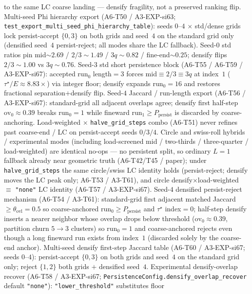 \documentclass[11pt]{article}
\begin{document}
to the same LC coarse landing --- densify fragility, not a preserved ranking
flip. Multi-seed Phi hierarchy export (A6-T50 / A3-EXP-si63;
\texttt{test\_export\_multi\_seed\_phi\_hierarchy\_table}): seeds $0$--$4$
$\times$ std/dense grids lock persist-accept $\{0,3\}$ on both grids and
seed~$4$ on the standard grid only (densified seed~$4$ persist-reject; all
modes share the LC fallback). Seed-$0$ std ratios pin mid$\sim 2.69$ /
$2/3\sim 1.49$ / $3q\sim 0.82$ / fine-end$\sim 0.25$; densify flips
$2/3\sim 1.00$ vs $3q\sim 0.76$. Seed-$3$ std short persistence block
(A6-T55 / A6-T59 / A3-EXP-si67): accepted $\mathrm{run}_0$ length${=}3$
forces mid$\equiv 2/3\equiv 3q$ at index~$1$ ($\tau^\star/E\approx 8.83\times$)
via integer floor; densify expands $\mathrm{run}_0{=}16$ and restores
fractional separation$+$densify flip. Seed-$4$ Jaccard / run-length
export (A6-T56 / A3-EXP-si67): standard-grid all adjacent overlaps
agree; densify first half-step $\mathrm{ov}_0\approx 0.39$ breaks
$\mathrm{run}_0{=}1$ while fineward $\mathrm{run}_1\ge P_{\mathrm{persist}}$
is discarded by coarse-anchoring. Load-weighted
$\times$ \texttt{halve\_grid\_steps} combo (A6-T51) never refines past
coarse-end / LC on persist-accept seeds $0/3/4$. Circle and swiss-roll
hybrids / experimental modes (including load-screened mid / two-thirds /
three-quarter / load-weighted) are identical no-ops --- no persistent
split, so ordinary $L{=}1$ fallback already near geometric truth
(A6-T42/T45 / paper); under \texttt{halve\_grid\_steps} the same
circle/swiss LC identity holds (persist-reject; densify moves the LC peak
only; A6-T53 / A3-T61), and circle densify$\times$load-weighted $\equiv$
\texttt{"none"} LC identity (A6-T57 / A3-EXP-si67). Seed-$4$ densified
persist-reject mechanism (A6-T54 / A3-T61): standard-grid first adjacent
matched Jaccard $\ge\theta_{\mathrm{ovl}}{=}0.5$ so coarse-anchored
$\mathrm{run}_0\ge P_{\mathrm{persist}}$ and $\tau^\star$ index${=}0$;
half-step densify inserts a nearer neighbor whose overlap drops below
threshold ($\mathrm{ov}_0\approx 0.39$, partition churn $5\to 3$
clusters) so $\mathrm{run}_0{=}1$ and coarse-anchored rejects even though
a long fineward run exists from index~$1$ (discarded solely by the
coarse-end anchor). Multi-seed densify first-step Jaccard table
(A6-T60 / A3-EXP-si67; seeds $0$--$4$): persist-accept $\{0,3\}$ on both
grids and seed~$4$ on the standard grid only; reject $\{1,2\}$ both grids
$+$ densified seed~$4$. Experimental densify-overlap recover
(A6-T58 / A3-EXP-si67; \texttt{PersistenceConfig.densify\_overlap\_recover}
default \texttt{"none"}): \texttt{"lower\_threshold"} substitutes floor
\end{document}
